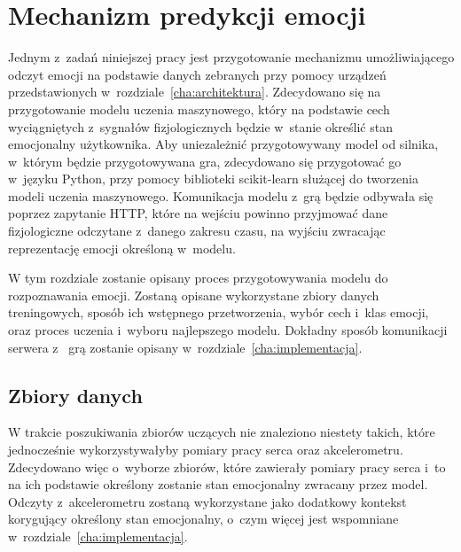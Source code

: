 \chapter{Mechanizm predykcji emocji}
\label{cha:predykcja}
Jednym z~zadań niniejszej pracy jest przygotowanie mechanizmu umożliwiającego odczyt emocji na podstawie danych zebranych przy pomocy urządzeń przedstawionych w~rozdziale~\ref{cha:architektura}. Zdecydowano się na przygotowanie modelu uczenia maszynowego, który na podstawie cech wyciągniętych z~sygnałów fizjologicznych będzie w~stanie określić stan emocjonalny użytkownika. Aby uniezależnić przygotowywany model od silnika, w~którym będzie przygotowywana gra, zdecydowano się przygotować go w~języku Python, przy pomocy biblioteki scikit-learn służącej do tworzenia modeli uczenia maszynowego. Komunikacja modelu z~grą będzie odbywała się poprzez zapytanie HTTP, które na wejściu powinno przyjmować dane fizjologiczne odczytane z~danego zakresu czasu, na wyjściu zwracając reprezentację emocji określoną w~modelu. 

W tym rozdziale zostanie opisany proces przygotowywania modelu do rozpoznawania emocji. Zostaną opisane wykorzystane zbiory danych treningowych, sposób ich wstępnego przetworzenia, wybór cech i~klas emocji, oraz proces uczenia i~wyboru najlepszego modelu. Dokładny sposób komunikacji serwera z~ grą zostanie opisany w~rozdziale~\ref{cha:implementacja}.
\section{Zbiory danych}
W trakcie poszukiwania zbiorów uczących nie znaleziono niestety takich, które jednocześnie wykorzystywałyby pomiary pracy serca oraz akcelerometru. Zdecydowano więc o~wyborze zbiorów, które zawierały pomiary pracy serca i~to na ich podstawie określony zostanie stan emocjonalny zwracany przez model. Odczyty z~akcelerometru zostaną wykorzystane jako dodatkowy kontekst korygujący określony stan emocjonalny, o~czym więcej jest wspomniane w~rozdziale~\ref{cha:implementacja}.

